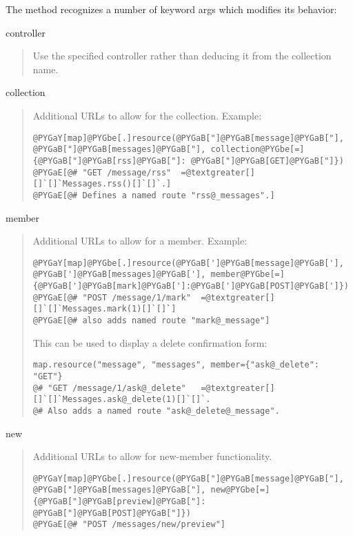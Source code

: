 \documentclass[letterpaper,10pt,english]{manual}
\begin{document}
The  method recognizes a number of keyword args which modifies
its behavior:

controller
\begin{quote}

Use the specified controller rather than deducing it from the collection
name.
\end{quote}

collection
\begin{quote}

Additional URLs to allow for the collection.  Example:

\begin{Verbatim}[commandchars=@\[\]]
@PYGaY[map]@PYGbe[.]resource(@PYGaB["]@PYGaB[message]@PYGaB["], @PYGaB["]@PYGaB[messages]@PYGaB["], collection@PYGbe[=]{@PYGaB["]@PYGaB[rss]@PYGaB["]: @PYGaB["]@PYGaB[GET]@PYGaB["]})
@PYGaE[@# "GET /message/rss"  =@textgreater[]  []`[]`Messages.rss()[]`[]`.]
@PYGaE[@# Defines a named route "rss@_messages".]
\end{Verbatim}
\end{quote}

member
\begin{quote}

Additional URLs to allow for a member.  Example:

\begin{Verbatim}[commandchars=@\[\]]
@PYGaY[map]@PYGbe[.]resource(@PYGaB[']@PYGaB[message]@PYGaB['], @PYGaB[']@PYGaB[messages]@PYGaB['], member@PYGbe[=]{@PYGaB[']@PYGaB[mark]@PYGaB[']:@PYGaB[']@PYGaB[POST]@PYGaB[']})
@PYGaE[@# "POST /message/1/mark"  =@textgreater[]  []`[]`Messages.mark(1)[]`[]`]
@PYGaE[@# also adds named route "mark@_message"]
\end{Verbatim}

This can be used to display a delete confirmation form:

\begin{Verbatim}[commandchars=@\[\]]
map.resource("message", "messages", member={"ask@_delete": "GET"}
@# "GET /message/1/ask@_delete"   =@textgreater[]   []`[]`Messages.ask@_delete(1)[]`[]`.
@# Also adds a named route "ask@_delete@_message".
\end{Verbatim}
\end{quote}

new
\begin{quote}

Additional URLs to allow for new-member functionality.

\begin{Verbatim}[commandchars=@\[\]]
@PYGaY[map]@PYGbe[.]resource(@PYGaB["]@PYGaB[message]@PYGaB["], @PYGaB["]@PYGaB[messages]@PYGaB["], new@PYGbe[=]{@PYGaB["]@PYGaB[preview]@PYGaB["]: @PYGaB["]@PYGaB[POST]@PYGaB["]})
@PYGaE[@# "POST /messages/new/preview"]
\end{Verbatim}
\end{quote}
\end{document}
